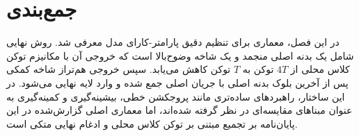 \section{جمع‌بندی}
در این فصل، معماری  برای تنظیم دقیق پارامتر-کارای مدل  معرفی شد. روش نهایی شامل یک بدنه اصلی منجمد و یک شاخه وضوح‌بالا است که خروجی آن با مکانیزم توکن کلاس محلی از $4T$ توکن به $T$ توکن کاهش می‌یابد. سپس خروجی هم‌تراز شاخه کمکی پس از آخرین بلوک بدنه اصلی با جریان اصلی جمع شده و وارد لایه نهایی می‌شود. در این ساختار، راهبردهای ساده‌تری مانند پروجکشن خطی، بیشینه‌گیری و کمینه‌گیری به عنوان مبناهای مقایسه‌ای در نظر گرفته شده‌اند، اما معماری اصلی گزارش‌شده در این پایان‌نامه بر تجمیع مبتنی بر توکن کلاس محلی و ادغام نهایی  متکی است.
